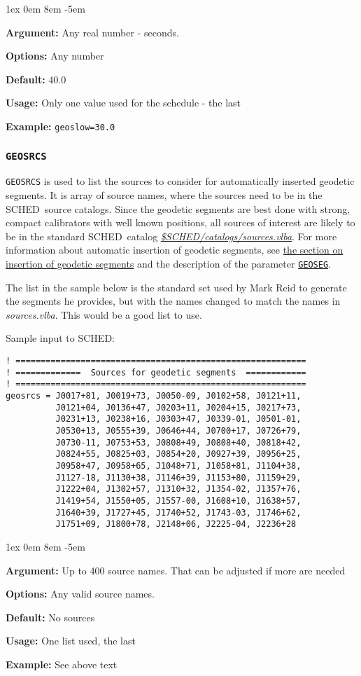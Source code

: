 \documentclass{report}
\newcommand{\sched}{{\sc SCHED}}
\newcommand{\schedb}{{\sc SCHED~}}
\newcommand{\rcwbox}[5]{
  \begin{list}{}{\parsep 1ex  \itemsep 0em
                 \leftmargin 8em  \itemindent -5em }
    \item {\bf Argument:} #1
    \item {\bf Options:}  #2
    \item {\bf Default:}  #3
    \item {\bf Usage:}    #4
    \item {\bf Example:}  #5
  \end{list}
}
\begin{document}
\rcwbox
{Any real number - seconds.}
{Any number}
{40.0}
{Only one value used for the schedule - the last}
{{\tt geoslow=30.0}}

\subsubsection{\label{MP:GEOSRCS}{\tt GEOSRCS}}

{\tt GEOSRCS} is used to list the sources to consider for
automatically inserted geodetic segments.  It is array of source
names, where the sources need to be in the \schedb source catalogs.
Since the geodetic segments are best done with strong, compact
calibrators with well known positions, all sources of interest are
likely to be in the standard \schedb catalog 
{\href{catalogs/sources.vlba}{{\sl \$SCHED/catalogs/sources.vlba}}}.
For more
information about automatic insertion of geodetic segments, see
{\hyperref[SEC:GEOSEG]{the section on insertion of geodetic segments}}
and the description of the parameter 
{\hyperref[MP:GEOSEG]{{\tt GEOSEG}}}.

The list in the sample below is the standard set used by Mark Reid
to generate the segments he provides, but with the names changed
to match the names in {\sl sources.vlba}.  This would be a good list
to use.

Sample input to \sched:

\begin{verbatim}
! ==========================================================
! =============  Sources for geodetic segments  ============
! ==========================================================
geosrcs = J0017+81, J0019+73, J0050-09, J0102+58, J0121+11,
          J0121+04, J0136+47, J0203+11, J0204+15, J0217+73,
          J0231+13, J0238+16, J0303+47, J0339-01, J0501-01,
          J0530+13, J0555+39, J0646+44, J0700+17, J0726+79,
          J0730-11, J0753+53, J0808+49, J0808+40, J0818+42,
          J0824+55, J0825+03, J0854+20, J0927+39, J0956+25,
          J0958+47, J0958+65, J1048+71, J1058+81, J1104+38,
          J1127-18, J1130+38, J1146+39, J1153+80, J1159+29,
          J1222+04, J1302+57, J1310+32, J1354-02, J1357+76,
          J1419+54, J1550+05, J1557-00, J1608+10, J1638+57,
          J1640+39, J1727+45, J1740+52, J1743-03, J1746+62,
          J1751+09, J1800+78, J2148+06, J2225-04, J2236+28

\end{verbatim}

\rcwbox
{Up to 400 source names.  That can be adjusted if more are needed}
{Any valid source names.}
{No sources}
{One list used, the last}
{See above text}
\end{document}
